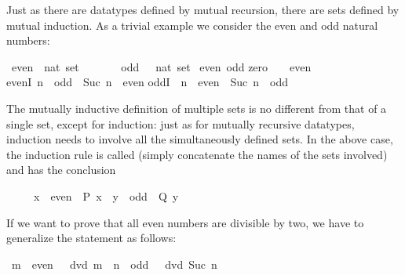 %
\begin{isabellebody}%
\def\isabellecontext{Mutual}%
\isamarkupfalse%
%
\isamarkuptrue%
%
\begin{isamarkuptext}%
Just as there are datatypes defined by mutual recursion, there are sets defined
by mutual induction. As a trivial example we consider the even and odd
natural numbers:%
\end{isamarkuptext}%
\isamarkuptrue%
\ even\ {\isacharcolon}{\isacharcolon}\ {\isachardoublequote}nat\ set{\isachardoublequote}\isanewline
\ \ \ \ \ \ \ odd\ \ {\isacharcolon}{\isacharcolon}\ {\isachardoublequote}nat\ set{\isachardoublequote}\isanewline
\isanewline
\isamarkupfalse%
\ even\ odd\isanewline
{}\isanewline
zero{\isacharcolon}\ \ {\isachardoublequote}{}\ {\isasymin}\ even{\isachardoublequote}\isanewline
evenI{\isacharcolon}\ {\isachardoublequote}n\ {\isasymin}\ odd\ {\isasymLongrightarrow}\ Suc\ n\ {\isasymin}\ even{\isachardoublequote}\isanewline
oddI{\isacharcolon}\ \ {\isachardoublequote}n\ {\isasymin}\ even\ {\isasymLongrightarrow}\ Suc\ n\ {\isasymin}\ odd{\isachardoublequote}\isamarkupfalse%
%
\begin{isamarkuptext}%
\noindent
The mutually inductive definition of multiple sets is no different from
that of a single set, except for induction: just as for mutually recursive
datatypes, induction needs to involve all the simultaneously defined sets. In
the above case, the induction rule is called 
(simply concatenate the names of the sets involved) and has the conclusion
\begin{isabelle}%
\ \ \ \ \ {\isacharparenleft}{\isacharquery}x\ {\isasymin}\ even\ {\isasymlongrightarrow}\ {\isacharquery}P\ {\isacharquery}x{\isacharparenright}\ {\isasymand}\ {\isacharparenleft}{\isacharquery}y\ {\isasymin}\ odd\ {\isasymlongrightarrow}\ {\isacharquery}Q\ {\isacharquery}y{\isacharparenright}%
\end{isabelle}

If we want to prove that all even numbers are divisible by two, we have to
generalize the statement as follows:%
\end{isamarkuptext}%
\isamarkuptrue%
\ {\isachardoublequote}{\isacharparenleft}m\ {\isasymin}\ even\ {\isasymlongrightarrow}\ {}\ dvd\ m{\isacharparenright}\ {\isasymand}\ {\isacharparenleft}n\ {\isasymin}\ odd\ {\isasymlongrightarrow}\ {}\ dvd\ {\isacharparenleft}Suc\ n{\isacharparenright}{\isacharparenright}{\isachardoublequote}\isamarkupfalse%
\isamarkuptrue%
\isamarkupfalse%
\isamarkuptrue%
\isamarkupfalse%
\isamarkupfalse%
\isamarkupfalse%
\isamarkupfalse%
\isamarkupfalse%
\isamarkupfalse%
\isamarkupfalse%
\isamarkupfalse%
\end{isabellebody}%
